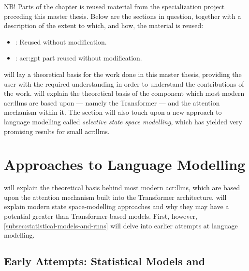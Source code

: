 \begin{itshape}
    NB! Parts of the  chapter is reused material from the specialization project \citep{holmLLMsDeathGIS2023} preceding this master thesis. Below are the sections in question, together with a description of the extent to which, and how, the material is reused:

    \begin{itemize}
        \item {}: Reused without modification.
        \item {}: \acrshort{acr:gpt} part reused without modification.
    \end{itemize}
\end{itshape}

\vspace{12pt}

\noindent {} will lay a theoretical basis for the work done in this master thesis, providing the user with the required understanding in order to understand the contributions of the work.  will explain the theoretical basis of the component which most modern \glspl{acr:llm} are based upon --- namely the Transformer --- and the attention mechanism within it. The section will also touch upon a new approach to language modelling called \textit{selective state space modelling}, which has yielded very promising results for small \glspl{acr:llm}.


\section{Approaches to Language Modelling}
\label{sec:language-modelling}

 will explain the theoretical basis behind most modern \glspl{acr:llm}, which are based upon the attention mechanism built into the Transformer architecture.  will explain modern state space-modelling approaches and why they may have a potential greater than Transformer-based models. First, however, \autoref{subsec:statistical-models-and-rnns} will delve into earlier attempts at language modelling.

\subsection[Early Attempts: Statistical Models and Recurrent Neural Networks]{Early Attempts: Statistical Models and }
\label{subsec:statistical-models-and-rnns}

